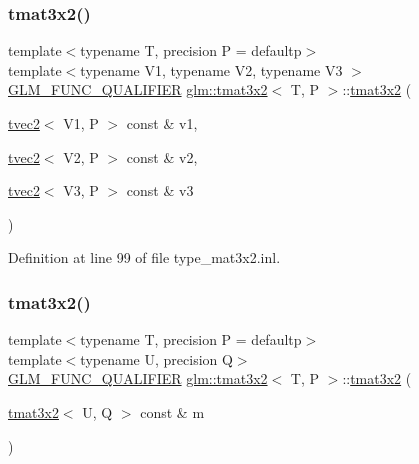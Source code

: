 \subsubsection{\texorpdfstring{tmat3x2()}{tmat3x2()}\hspace{0.1cm}{\footnotesize\ttfamily [21/22]}}
{\footnotesize\ttfamily template$<$typename T, precision P = defaultp$>$ \\
template$<$typename V1, typename V2, typename V3 $>$ \\
\mbox{\hyperlink{setup_8hpp_a33fdea6f91c5f834105f7415e2a64407}{G\+L\+M\+\_\+\+F\+U\+N\+C\+\_\+\+Q\+U\+A\+L\+I\+F\+I\+ER}} \mbox{\hyperlink{structglm_1_1tmat3x2}{glm\+::tmat3x2}}$<$ T, P $>$\+::\mbox{\hyperlink{structglm_1_1tmat3x2}{tmat3x2}} (\begin{DoxyParamCaption}\item[{\mbox{\hyperlink{structglm_1_1tvec2}{tvec2}}$<$ V1, P $>$ const \&}]{v1,  }\item[{\mbox{\hyperlink{structglm_1_1tvec2}{tvec2}}$<$ V2, P $>$ const \&}]{v2,  }\item[{\mbox{\hyperlink{structglm_1_1tvec2}{tvec2}}$<$ V3, P $>$ const \&}]{v3 }\end{DoxyParamCaption})}



Definition at line 99 of file type\+\_\+mat3x2.\+inl.

\mbox{\label{structglm_1_1tmat3x2_ad33526a04ab8966123185267eb201755}} 
\subsubsection{\texorpdfstring{tmat3x2()}{tmat3x2()}\hspace{0.1cm}{\footnotesize\ttfamily [22/22]}}
{\footnotesize\ttfamily template$<$typename T, precision P = defaultp$>$ \\
template$<$typename U, precision Q$>$ \\
\mbox{\hyperlink{setup_8hpp_a33fdea6f91c5f834105f7415e2a64407}{G\+L\+M\+\_\+\+F\+U\+N\+C\+\_\+\+Q\+U\+A\+L\+I\+F\+I\+ER}} \mbox{\hyperlink{structglm_1_1tmat3x2}{glm\+::tmat3x2}}$<$ T, P $>$\+::\mbox{\hyperlink{structglm_1_1tmat3x2}{tmat3x2}} (\begin{DoxyParamCaption}\item[{\mbox{\hyperlink{structglm_1_1tmat3x2}{tmat3x2}}$<$ U, Q $>$ const \&}]{m }\end{DoxyParamCaption})}



